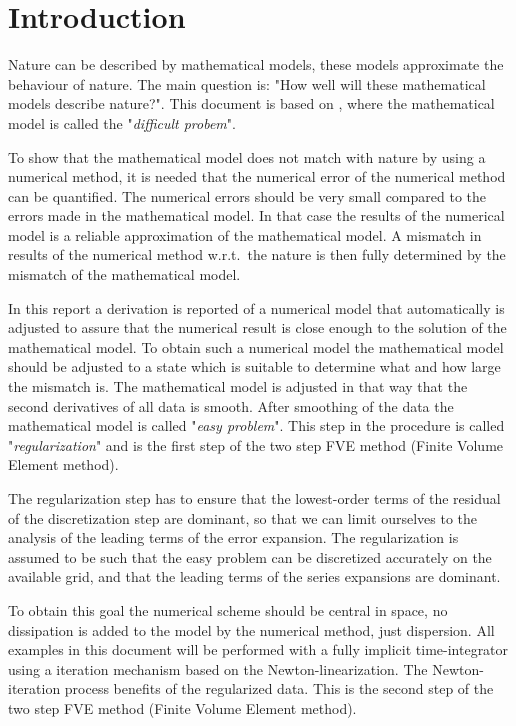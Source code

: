\chapter{Introduction}\label{sec:introduction}


Nature can be described by mathematical models, these models approximate the behaviour of nature.
The main question is: "How well will these mathematical models describe nature?".
This document is based on \citet{Borsboom1998}, where the mathematical model is called the "\textsl{difficult probem}".

To show that the mathematical model does not match with nature by using a numerical method, it is needed that the numerical error of the numerical method can be quantified.
The numerical errors should be very small compared to the errors made in the mathematical model.
In that case the results of the numerical model is a reliable approximation of the mathematical model.
A mismatch in results of the numerical method w.r.t.\ the nature is then fully determined by the mismatch of the mathematical model.

In this report a derivation is reported of a numerical model that automatically is adjusted to assure that the numerical result is close enough to the solution of the mathematical model.
To obtain such a numerical model the mathematical model should be adjusted to a state which is suitable to determine what and how large the mismatch is.
The mathematical model is adjusted in that way that the second derivatives of all data is smooth.
After smoothing of the data the mathematical model is called "\textsl{easy problem}".
This step in the procedure is called "\textsl{regularization}" and is the first step of the two step FVE method (Finite Volume Element method).

The regularization step has to ensure that the lowest-order terms of the residual of the discretization step are dominant, so that we can limit ourselves to the analysis of the leading terms of the error expansion.
The regularization is assumed to be such that the easy problem can be discretized accurately on the available grid, and that the leading terms of the series expansions are dominant.

To obtain this goal the numerical scheme should be central in space, no dissipation is added to the model by the numerical method, just dispersion.
All examples in this document will be performed with a fully implicit time-integrator using a iteration mechanism based on the Newton-linearization.
The Newton-iteration process benefits of the regularized data.
This is the second step of the two step FVE method (Finite Volume Element method).

